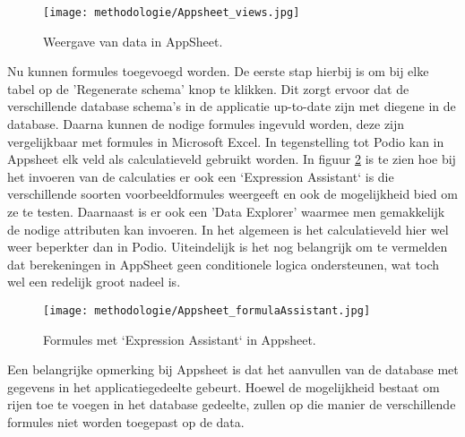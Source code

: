 \begin{figure}[h]
    \centering
    \texttt{[image: methodologie/Appsheet\_views.jpg]}
    \caption{Weergave van data in AppSheet.}
    \label{fig:meth_appsheet_views}
\end{figure}

Nu kunnen formules toegevoegd worden. De eerste stap hierbij is om bij elke tabel op de 'Regenerate schema' knop te klikken. Dit zorgt ervoor dat de verschillende database schema's in de applicatie up-to-date zijn met diegene in de database. Daarna kunnen de nodige formules ingevuld worden, deze zijn vergelijkbaar met formules in Microsoft Excel. In tegenstelling tot Podio kan in Appsheet elk veld als calculatieveld gebruikt worden. In figuur \ref{fig:meth_appsheet_formulas} is te zien hoe bij het invoeren van de calculaties er ook een `Expression Assistant` is die verschillende soorten voorbeeldformules weergeeft en ook de mogelijkheid bied om ze te testen. Daarnaast is er ook een 'Data Explorer' waarmee men gemakkelijk de nodige attributen kan invoeren. In het algemeen is het calculatieveld hier wel weer beperkter dan in Podio. Uiteindelijk is het nog belangrijk om te vermelden dat berekeningen in AppSheet geen conditionele logica ondersteunen, wat toch wel een redelijk groot nadeel is. \\

\begin{figure}[h]
    \centering
    \texttt{[image: methodologie/Appsheet\_formulaAssistant.jpg]}
    \caption{Formules met `Expression Assistant` in Appsheet.}
    \label{fig:meth_appsheet_formulas}
\end{figure}

Een belangrijke opmerking bij Appsheet is dat het aanvullen van de database met gegevens in het applicatiegedeelte gebeurt. Hoewel de mogelijkheid bestaat om rijen toe te voegen in het database gedeelte, zullen op die manier de verschillende formules niet worden toegepast op de data. \\


